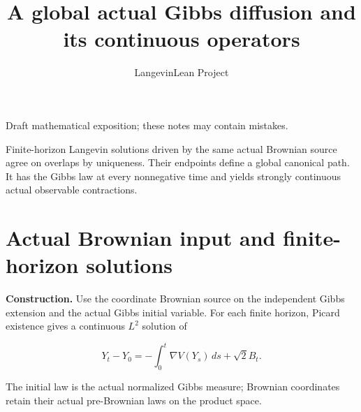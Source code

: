 \documentclass[11pt,a4paper]{article}
\title{\texorpdfstring{A global actual Gibbs diffusion and its continuous operators}{A global actual Gibbs diffusion and its continuous operators}}
\author{LangevinLean Project}
\date{}
\begin{document}
\maketitle
Draft mathematical exposition; these notes may contain mistakes.


Finite-horizon Langevin solutions driven by the same actual Brownian source agree on overlaps by uniqueness. Their endpoints define a global canonical path. It has the Gibbs law at every nonnegative time and yields strongly continuous actual observable contractions.


\section{\texorpdfstring{Actual Brownian input and finite-horizon solutions}{Actual Brownian input and finite-horizon solutions}}


\textbf{Construction.} Use the coordinate Brownian source on the independent Gibbs extension and the actual Gibbs initial variable. For each finite horizon, Picard existence gives a continuous \(L^2\) solution of

\[Y_t-Y_0=-\int_0^t\nabla V(Y_s)\,ds+\sqrt2 B_t.\]

The initial law is the actual normalized Gibbs measure; Brownian coordinates retain their actual pre-Brownian laws on the product space.
\end{document}
